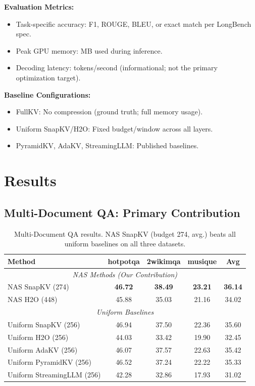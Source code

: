 \documentclass[11pt,a4paper]{article}
\begin{document}
\textbf{Evaluation Metrics:}
\begin{itemize}
    \item Task-specific accuracy: F1, ROUGE, BLEU, or exact match per LongBench spec.
    \item Peak GPU memory: MB used during inference.
    \item Decoding latency: tokens/second (informational; not the primary optimization target).
\end{itemize}

\textbf{Baseline Configurations:}
\begin{itemize}
    \item FullKV: No compression (ground truth; full memory usage).
    \item Uniform SnapKV/H2O: Fixed budget/window across all layers.
    \item PyramidKV, AdaKV, StreamingLLM: Published baselines.
\end{itemize}

\section{Results}

\subsection{Multi-Document QA: Primary Contribution}

\begin{table}[t]
\centering
\small
\begin{tabular}{l c c c c}
\toprule
\textbf{Method} & \textbf{hotpotqa} & \textbf{2wikimqa} & \textbf{musique} & \textbf{Avg} \\
\midrule
\multicolumn{5}{c}{\textit{NAS Methods (Our Contribution)}} \\
NAS SnapKV (274) & \textbf{46.72} & \textbf{38.49} & \textbf{23.21} & \textbf{36.14} \\
NAS H2O (448) & 45.88 & 35.03 & 21.16 & 34.02 \\
\midrule
\multicolumn{5}{c}{\textit{Uniform Baselines}} \\
Uniform SnapKV (256) & 46.94 & 37.50 & 22.36 & 35.60 \\
Uniform H2O (256) & 44.03 & 33.42 & 19.90 & 32.45 \\
Uniform AdaKV (256) & 46.07 & 37.57 & 22.63 & 35.42 \\
Uniform PyramidKV (256) & 46.52 & 37.24 & 22.22 & 35.33 \\
Uniform StreamingLLM (256) & 42.28 & 32.86 & 17.93 & 31.02 \\
\bottomrule
\end{tabular}
\caption{Multi-Document QA results. NAS SnapKV (budget 274, avg.) beats all uniform baselines on all three datasets.}
\label{tab:multidoc}
\end{table}
\end{document}
